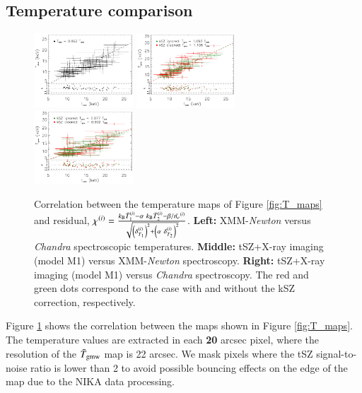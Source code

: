 \documentclass[twocolumn,traditabstract]{aa}
\begin{document}
\subsection{Temperature comparison}\label{sec:compT}
\begin{figure}[h]
\centering
\includegraphics[width=0.33\textwidth]{Figure/Thermo_correlation_TXMM-TCXO.pdf}
\includegraphics[width=0.33\textwidth]{Figure/Thermo_correlation_TXMM-TSZ_leff1.pdf}
\includegraphics[width=0.33\textwidth]{Figure/Thermo_correlation_TCXO-TSZ_leff1.pdf}
\caption{\footnotesize{Correlation between the temperature maps of Figure \ref{fig:T_maps} and residual, $\chi^{(i)} = \frac{k_{\rm B} \bar{T}^{(i)}_{1} - \alpha \ k_{\rm B} \bar{T}^{(i)}_{2} - {\beta}/{\bar{n_e}^{(i)}}}{\sqrt{\left(\delta^{(i)}_{T_{1}}\right)^2 + \left(\alpha \ \delta^{(i)}_{T_{2}}\right)^2}}$. {\bf Left:} XMM-\textit{Newton} versus \textit{Chandra} spectroscopic temperatures. {\bf Middle:} tSZ+X-ray imaging (model M1) versus XMM-\textit{Newton} spectroscopy. {\bf Right:} tSZ+X-ray imaging (model M1) versus \textit{Chandra} spectroscopy. The red and green dots correspond to the case with and without the kSZ correction, respectively.}}
\label{fig:T_SZ_T_X_correlation}
\end{figure}

Figure \ref{fig:T_SZ_T_X_correlation} shows the correlation between the maps shown in Figure \ref{fig:T_maps}. The temperature values are extracted in each {\bf 20} arcsec pixel, where the resolution of the $\bar{T}_{\rm gmw}$ map is 22 arcsec. We mask pixels where the tSZ signal-to-noise ratio is lower than 2 to avoid possible bouncing effects on the edge of the map due to the NIKA data processing.
\end{document}
